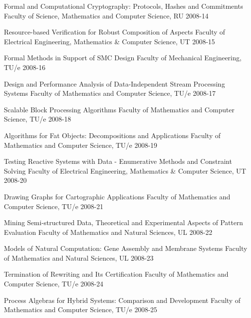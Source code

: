 \begin{multicols}{2}
         {Formal and Computational Cryptography: Protocols, Hashes and Commitments}
     {Faculty of Science, Mathematics and Computer Science, RU}
         {2008-14}

         {Resource-based Verification for Robust Composition of Aspects}
         {Faculty of Electrical Engineering, Mathematics \& Computer Science, UT}
         {2008-15}

         {Formal Methods in Support of SMC Design}
         {Faculty of Mechanical Engineering, TU/e}
         {2008-16}

         {Design and Performance Analysis of Data-Independent Stream Processing       Systems}
         {Faculty of Mathematics and Computer Science, TU/e}
         {2008-17}

         {Scalable Block Processing Algorithms}
         {Faculty of Mathematics and Computer Science, TU/e}
         {2008-18}

         {Algorithms for Fat Objects: Decompositions and Applications}
         {Faculty of Mathematics and Computer Science, TU/e}
         {2008-19}

         {Testing Reactive Systems with Data - Enumerative Methods and Constraint Solving}
         {Faculty of Electrical Engineering, Mathematics \& Computer Science, UT}
         {2008-20}

         {Drawing Graphs for Cartographic Applications}
         {Faculty of Mathematics and Computer Science, TU/e}
         {2008-21}

         {Mining Semi-structured Data, Theoretical and Experimental Aspects of Pattern Evaluation}
         {Faculty of Mathematics and Natural Sciences, UL}
         {2008-22}

         {Models of Natural Computation: Gene Assembly and Membrane Systems}
         {Faculty of Mathematics and Natural Sciences, UL}
         {2008-23}

         {Termination of Rewriting and Its Certification}
         {Faculty of Mathematics and Computer Science, TU/e}
         {2008-24}

         {Process Algebras for Hybrid Systems: Comparison and Development}
         {Faculty of Mathematics and Computer Science, TU/e}
         {2008-25}


\end{multicols}

